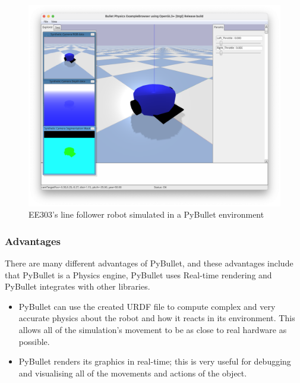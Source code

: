 \documentclass[a4paper,12pt]{article}
\begin{document}
\begin{figure}[h]
\centering
\includegraphics[width=12cm]{./imgs/PyBullet.png}
\caption{EE303's line follower robot simulated in a PyBullet environment}
\label{fig:PyBullet}
\end{figure}

\subsubsection{Advantages}

There are many different advantages of PyBullet, and these advantages include that PyBullet is a Physics engine, PyBullet uses Real-time rendering and PyBullet integrates with other libraries.

\begin{itemize}
  \item PyBullet can use the created URDF file to compute complex and very accurate physics about the robot and how it reacts in its environment. This allows all of the simulation's movement to be as close to real hardware as possible.

  \item PyBullet renders its graphics in real-time; this is very useful for debugging and visualising all of the movements and actions of the object.

\end{itemize}
\end{document}
